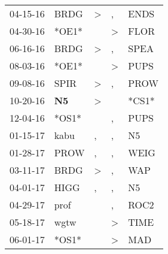 \begin{supertabular}{p{0.07\textwidth}p{0.06\textwidth}p{0.02\textwidth}p{0.02\textwidth}p{0.06\textwidth}}
          04-15-16\textsuperscript{} &           BRDG\textsuperscript{} &     \textgreater &                , &           ENDS\textsuperscript{} \\
          04-30-16\textsuperscript{} &                            *OE1* &                  &     \textgreater &           FLOR\textsuperscript{} \\
          06-16-16\textsuperscript{} &           BRDG\textsuperscript{} &     \textgreater &                , &           SPEA\textsuperscript{} \\
          08-03-16\textsuperscript{} &                            *OE1* &                  &     \textgreater &           PUPS\textsuperscript{} \\
          09-08-16\textsuperscript{} &           SPIR\textsuperscript{} &     \textgreater &                , &           PROW\textsuperscript{} \\
          10-20-16\textsuperscript{} &    \textbf{N5\textsuperscript{}} &     \textgreater &                  &                            *CS1* \\
          12-04-16\textsuperscript{} &                            *OS1* &                  &                , &           PUPS\textsuperscript{} \\
          01-15-17\textsuperscript{} &           kabu\textsuperscript{} &                , &                , &             N5\textsuperscript{} \\
          01-28-17\textsuperscript{} &           PROW\textsuperscript{} &                , &                , &           WEIG\textsuperscript{} \\
          03-11-17\textsuperscript{} &           BRDG\textsuperscript{} &     \textgreater &                , &            WAP\textsuperscript{} \\
          04-01-17\textsuperscript{} &           HIGG\textsuperscript{} &                , &                , &             N5\textsuperscript{} \\
          04-29-17\textsuperscript{} &           prof\textsuperscript{} &                  &                , &           ROC2\textsuperscript{} \\
          05-18-17\textsuperscript{} &           wgtw\textsuperscript{} &                  &     \textgreater &           TIME\textsuperscript{} \\
          06-01-17\textsuperscript{} &                            *OS1* &                  &     \textgreater &            MAD\textsuperscript{} \\

\end{supertabular}
